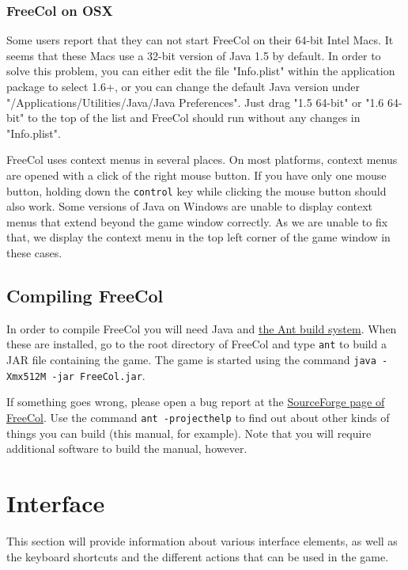 \documentclass[12pt]{book}
\begin{document}
\hypertarget{FreeCol on OSX}{\subsection{FreeCol on OSX}}

Some users report that they can not start FreeCol on their 64-bit
Intel Macs. It seems that these Macs use a 32-bit version of Java 1.5
by default. In order to solve this problem, you can either edit the
file "Info.plist" within the application package to select 1.6+, or
you can change the default Java version under
"/Applications/Utilities/Java/Java Preferences".  Just drag "1.5
64-bit" or "1.6 64-bit" to the top of the list and FreeCol should run
without any changes in "Info.plist".

FreeCol uses context menus in several places. On most platforms,
context menus are opened with a click of the right mouse button. If
you have only one mouse button, holding down the \texttt{control} key
while clicking the mouse button should also work. Some versions of
Java on Windows are unable to display context menus that extend beyond
the game window correctly. As we are unable to fix that, we display
the context menu in the top left corner of the game window in these
cases.


\hypertarget{Compiling FreeCol}{\section{Compiling FreeCol}}

In order to compile FreeCol you will need Java and
\href{http://ant.apache.org/}{the Ant build system}. When these are
installed, go to the root directory of FreeCol and type \verb$ant$ to
build a JAR file containing the game. The game is started using the
command \verb$java -Xmx512M -jar FreeCol.jar$.

If something goes wrong, please open a bug report at the
\href{http://sourceforge.net/projects/freecol}{SourceForge page of
  FreeCol}. Use the command \verb$ant -projecthelp$ to find out
about other kinds of things you can build (this manual, for
example). Note that you will require additional software to build the
manual, however.


\hypertarget{Interface}{\chapter{Interface}}

This section will provide information about various interface
elements, as well as the keyboard shortcuts and the different actions
that can be used in the game.
\end{document}
